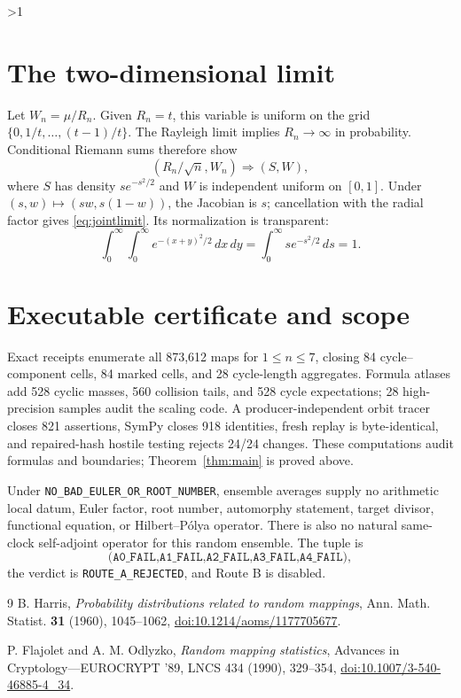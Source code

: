 \documentclass[10pt]{article}
\providecommand{\CRevisionRound}{2}
\begin{document}
\ifnum\CRevisionRound>1
\section{The two-dimensional limit}
Let $W_n=\mu/R_n$.  Given $R_n=t$, this variable is uniform on the grid
$\{0,1/t,\ldots,(t-1)/t\}$.  The Rayleigh limit implies $R_n\to\infty$ in
probability.  Conditional Riemann sums therefore show
\[
 (R_n/\sqrt n,W_n)\Rightarrow(S,W),
\]
where $S$ has density $s e^{-s^2/2}$ and $W$ is independent uniform on
$[0,1]$.  Under $(s,w)\mapsto(sw,s(1-w))$, the Jacobian is $s$; cancellation
with the radial factor gives \eqref{eq:jointlimit}.  Its normalization is
transparent:
\[
 \int_0^\infty\!\int_0^\infty e^{-(x+y)^2/2}\,dx\,dy
 =\int_0^\infty s e^{-s^2/2}\,ds=1.
\]

\section{Executable certificate and scope}
Exact receipts enumerate all 873,612 maps for $1\le n\le7$, closing 84
cycle--component cells, 84 marked cells, and 28 cycle-length aggregates.
Formula atlases add 528 cyclic masses, 560 collision tails, and 528 cycle
expectations; 28 high-precision samples audit the scaling code.  A
producer-independent orbit tracer closes 821 assertions, SymPy closes 918
identities, fresh replay is byte-identical,
and repaired-hash hostile testing rejects 24/24 changes.  These computations
audit formulas and boundaries; Theorem~\ref{thm:main} is proved above.

Under \texttt{NO\_BAD\_EULER\_OR\_ROOT\_NUMBER}, ensemble averages supply no
arithmetic local datum, Euler factor, root number, automorphy statement, target
divisor, functional equation, or Hilbert--P\'olya operator.  There is also no
natural same-clock self-adjoint operator for this random ensemble.  The tuple
is
\[
\texttt{(A0\_FAIL,A1\_FAIL,A2\_FAIL,A3\_FAIL,A4\_FAIL)},
\]
the verdict is \texttt{ROUTE\_A\_REJECTED}, and Route B is disabled.
\fi

\begin{thebibliography}{9}
B. Harris,
\emph{Probability distributions related to random mappings},
Ann. Math. Statist. \textbf{31} (1960), 1045--1062,
\href{https://doi.org/10.1214/aoms/1177705677}
{doi:10.1214/aoms/1177705677}.

P. Flajolet and A. M. Odlyzko,
\emph{Random mapping statistics},
Advances in Cryptology---EUROCRYPT '89, LNCS 434 (1990), 329--354,
\href{https://doi.org/10.1007/3-540-46885-4_34}
{doi:10.1007/3-540-46885-4\_34}.
\end{thebibliography}
\end{document}
